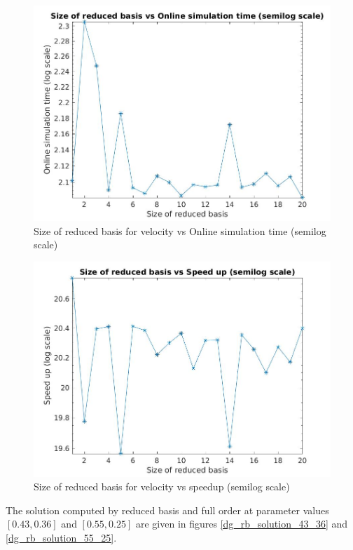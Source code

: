 \documentclass[a4paper,oneside,openright,spanish,english]{book}
\begin{document}
\begin{figure}
  \includegraphics[width=\linewidth]{size_vs_online_simulation_time_semilog.jpg}
  \caption{Size of reduced basis for velocity vs Online simulation time (semilog scale)} 
\label{online_simulation_time}
\end{figure}

\begin{figure}
  \includegraphics[width=\linewidth]{size_vs_reduced_basis_semilog.jpg}
  \caption{Size of reduced basis for velocity vs speedup (semilog scale)} 
\label{speedup}
\end{figure}

The solution computed by reduced basis and full order at parameter values $[0.43,0.36]$ and $[0.55,0.25]$ are given in figures \ref{dg_rb_solution_43_36} and \ref{dg_rb_solution_55_25}.
\end{document}
